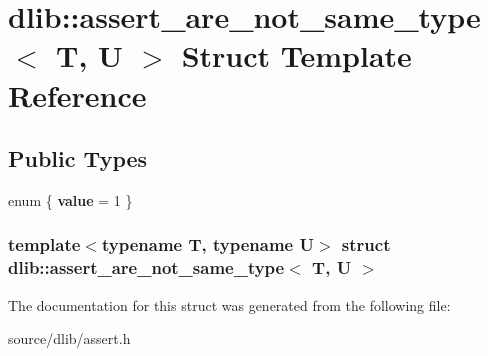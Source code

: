 \hypertarget{structdlib_1_1assert__are__not__same__type}{
\section{dlib::assert\_\-are\_\-not\_\-same\_\-type$<$ T, U $>$ Struct Template Reference}
\label{structdlib_1_1assert__are__not__same__type}
}
\subsection*{Public Types}
\begin{DoxyCompactItemize}
\item 
enum \{ {\bfseries value} = 1
 \}
\end{DoxyCompactItemize}
\subsubsection*{template$<$typename T, typename U$>$ struct dlib::assert\_\-are\_\-not\_\-same\_\-type$<$ T, U $>$}



The documentation for this struct was generated from the following file:\begin{DoxyCompactItemize}
\item 
source/dlib/assert.h\end{DoxyCompactItemize}
